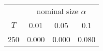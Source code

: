 % 
\begin{tabular}{cccc}
  \hline
  & \multicolumn{3}{c}{nominal size $\alpha$} \\
 $T$ & 0.01 & 0.05 & 0.1 \\
 \hline
250 & 0.000 & 0.000 & 0.080 \\ 
   \hline
\end{tabular}
